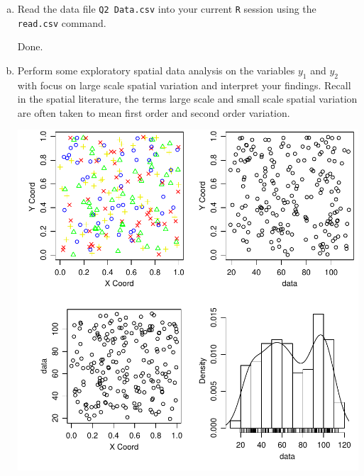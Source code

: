 \documentclass[letterpaper, 12pt]{article}\usepackage[]{graphicx}\usepackage[]{color}
\makeatletter
\def\maxwidth{ %
  \ifdim\Gin@nat@width>\linewidth
    \linewidth
  \else
    \Gin@nat@width
  \fi
}
\newenvironment{knitrout}{}{} %
\makeatother
\begin{document}
\begin{enumerate}[(a)]
\item
Read the data file \texttt{Q2 Data.csv} into your current \texttt{R} session using the \texttt{read.csv} command.

\textsf{Done}.
\item
Perform some exploratory spatial data analysis on the variables $y_1$ and $y_2$ with focus on large scale spatial variation and interpret your findings. Recall in the spatial literature, the terms large scale and small scale spatial variation are often taken to mean first order and second order variation.



\begin{knitrout}
\color{fgcolor}
\includegraphics[width=\maxwidth]{figure/plot1} 

\end{knitrout}


\end{enumerate}
\end{document}
